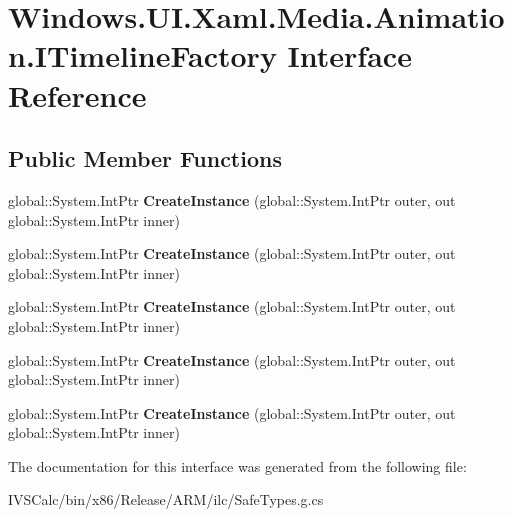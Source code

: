 \hypertarget{interface_windows_1_1_u_i_1_1_xaml_1_1_media_1_1_animation_1_1_i_timeline_factory}{}\section{Windows.\+U\+I.\+Xaml.\+Media.\+Animation.\+I\+Timeline\+Factory Interface Reference}
\label{interface_windows_1_1_u_i_1_1_xaml_1_1_media_1_1_animation_1_1_i_timeline_factory}
\subsection*{Public Member Functions}
\begin{DoxyCompactItemize}
\item 
\mbox{\label{interface_windows_1_1_u_i_1_1_xaml_1_1_media_1_1_animation_1_1_i_timeline_factory_a78398993a169985b75f9e84444aa67e0}} 
global\+::\+System.\+Int\+Ptr {\bfseries Create\+Instance} (global\+::\+System.\+Int\+Ptr outer, out global\+::\+System.\+Int\+Ptr inner)
\item 
\mbox{\label{interface_windows_1_1_u_i_1_1_xaml_1_1_media_1_1_animation_1_1_i_timeline_factory_a78398993a169985b75f9e84444aa67e0}} 
global\+::\+System.\+Int\+Ptr {\bfseries Create\+Instance} (global\+::\+System.\+Int\+Ptr outer, out global\+::\+System.\+Int\+Ptr inner)
\item 
\mbox{\label{interface_windows_1_1_u_i_1_1_xaml_1_1_media_1_1_animation_1_1_i_timeline_factory_a78398993a169985b75f9e84444aa67e0}} 
global\+::\+System.\+Int\+Ptr {\bfseries Create\+Instance} (global\+::\+System.\+Int\+Ptr outer, out global\+::\+System.\+Int\+Ptr inner)
\item 
\mbox{\label{interface_windows_1_1_u_i_1_1_xaml_1_1_media_1_1_animation_1_1_i_timeline_factory_a78398993a169985b75f9e84444aa67e0}} 
global\+::\+System.\+Int\+Ptr {\bfseries Create\+Instance} (global\+::\+System.\+Int\+Ptr outer, out global\+::\+System.\+Int\+Ptr inner)
\item 
\mbox{\label{interface_windows_1_1_u_i_1_1_xaml_1_1_media_1_1_animation_1_1_i_timeline_factory_a78398993a169985b75f9e84444aa67e0}} 
global\+::\+System.\+Int\+Ptr {\bfseries Create\+Instance} (global\+::\+System.\+Int\+Ptr outer, out global\+::\+System.\+Int\+Ptr inner)
\end{DoxyCompactItemize}


The documentation for this interface was generated from the following file\+:\begin{DoxyCompactItemize}
\item 
I\+V\+S\+Calc/bin/x86/\+Release/\+A\+R\+M/ilc/Safe\+Types.\+g.\+cs\end{DoxyCompactItemize}
